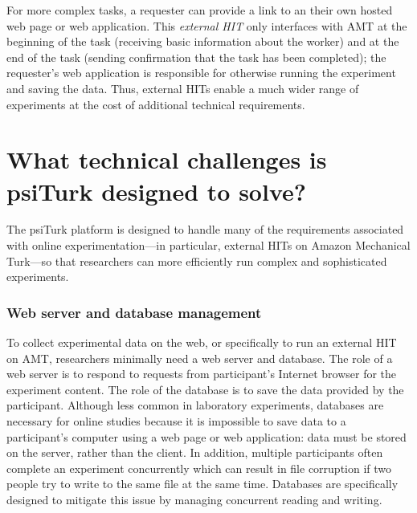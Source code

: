 \documentclass[twocolumn]{svjour3}          %
\newcommand{\psiturk}[0]{\textsf{psiTurk}}
\begin{document}
For more complex tasks, a requester can provide a link to an their own hosted web page or
web application. This \emph{external HIT} only interfaces with AMT at the beginning of the task (receiving 
basic information about the worker) and at the end of the task (sending confirmation that the task 
has been completed); the requester's web application is responsible for otherwise running the 
experiment and saving the data.  Thus, external HITs enable a much wider range of experiments at 
the cost of additional technical requirements.



\section{What technical challenges is \psiturk{} designed to solve?}

The \psiturk{} platform is designed to handle many of the requirements associated with online experimentation---in particular, external HITs on Amazon Mechanical Turk---so that researchers can more efficiently run complex and sophisticated experiments.

\subsubsection{Web server and database management}
\label{sec:web-and-database}

To collect experimental data on the web, or specifically to run an external HIT on AMT, 
researchers minimally need a web server and database.  
The role of a web server is to respond to requests from participant's Internet browser 
for the experiment content.  The role of the database is to save the data provided by 
the participant.  Although less common in laboratory experiments, databases are 
necessary for online studies because it is impossible to save data to a participant's 
computer using a web page or web application: data must be stored on the server,
rather than the client.  In addition, multiple participants often complete an 
experiment concurrently which can result in file corruption if two people try to
write to the same file at the same time. Databases are specifically designed to 
mitigate this issue by managing concurrent reading and writing.
 
\end{document}
